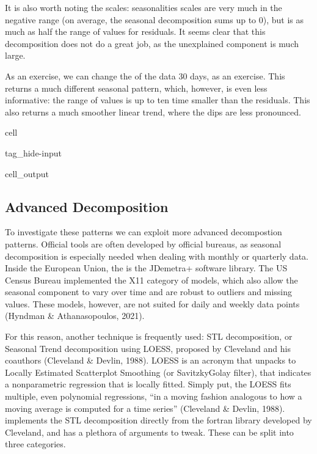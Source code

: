 \documentclass[letterpaper,10pt,english]{jupyterBook}
\begin{document}
\sphinxAtStartPar
It is also worth noting the scales: seasonalities scales are very much in the negative range (on average, the seasonal decomposition sums up to 0), but is as much as half the range of values for residuals. It seems clear that this decomposition does not do a great job, as the unexplained component is much large.

\sphinxAtStartPar
As an exercise, we can change the  of the data 30 days, as an exercise. This returns a much different seasonal pattern, which, however, is even less informative: the range of values is up to ten time smaller than the residuals. This also returns a much smoother linear trend, where the dips are less pronounced.

\begin{sphinxuseclass}{cell}
\begin{sphinxuseclass}{tag_hide-input}
\begin{sphinxuseclass}{cell_output}
\noindent{}

\end{sphinxuseclass}
\end{sphinxuseclass}
\end{sphinxuseclass}

\subsection{Advanced Decomposition}
\label{\detokenize{05-time_series_analysis:advanced-decomposition}}
\sphinxAtStartPar
To investigate these patterns we can exploit more advanced decompostion patterns. Official tools are often developed by official bureaus, as seasonal decomposition is especially needed when dealing with monthly or quarterly data. Inside the European Union, the  is the JDemetra+ software library. The US Census Bureau implemented the X\sphinxhyphen{}11 category of models, which also allow the seasonal component to vary over time and are robust to outliers and missing values. These models, however, are not suited for daily and weekly data points (Hyndman \& Athanasopoulos, 2021).

\sphinxAtStartPar
For this reason, another technique is frequently used: STL decomposition, or Seasonal Trend decomposition using LOESS, proposed by Cleveland and his coauthors (Cleveland \& Devlin, 1988). LOESS is an acronym that unpacks to Locally Estimated Scatterplot Smoothing (or Savitzky\sphinxhyphen{}Golay filter), that indicates a non\sphinxhyphen{}parametric regression that is locally fitted. Simply put, the LOESS fits multiple, even polynomial regressions, “in a moving fashion analogous to how a moving average is computed for a time series” (Cleveland \& Devlin, 1988).  implements the STL decomposition directly from the fortran library developed by Cleveland, and has a plethora of arguments to tweak. These can be split into three categories.
\end{document}
